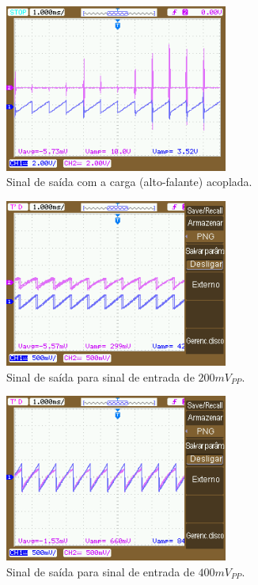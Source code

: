     \begin{figure}[h!]
        \centering
        \includegraphics[height=5.5cm]{imgSource/oscilloscope/NewFile4.png}
        \caption{Sinal de saída com a carga (alto-falante) acoplada.}
        \label{fig:newFile4}
    \end{figure}
    
    \begin{figure}[h!]
        \centering
        \includegraphics[height=5.5cm]{imgSource/oscilloscope/NewFile5.png}
        \caption{Sinal de saída para sinal de entrada de $200mV_{PP}$.}
        \label{fig:newFile5}
    \end{figure}
    
    \begin{figure}[h!]
        \centering
        \includegraphics[height=5.5cm]{imgSource/oscilloscope/NewFile6.png}
        \caption{Sinal de saída para sinal de entrada de $400mV_{PP}$.}
        \label{fig:newFile6}
    \end{figure}
    
